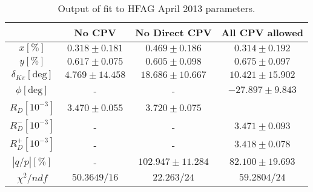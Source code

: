 \begin{table}[htdp]

\begin{center}
\begin{tabular}{|c||c||c||c|}
\hline
& No CPV & No Direct CPV & All CPV allowed \\ \hline

$x[\%]                    $ &$0.318\pm 0.181$ &$0.469\pm 0.186$ & $0.314\pm 0.192$\\ \hline

$y[\%]                    $ &$0.617\pm 0.075$ &$0.605\pm 0.098$ & $0.675\pm 0.097$\\ \hline

$\delta_{K\pi}[\text{deg}]$ &$4.769\pm 14.458$ &$18.686\pm 10.667$ &$10.421\pm 15.902$ \\ \hline

$\phi[\text{deg}]         $ &- &- &$-27.897\pm 9.843$ \\ \hline

$R_D[10^{-3}]             $ &$3.470\pm 0.055$ &$3.720\pm 0.075$ & \\ \hline

$R_D^-[10^{-3}]           $ &- &- &$3.471\pm 0.093$ \\ \hline

$R_D^+[10^{-3}]           $ &- &- &$3.418\pm 0.078$ \\ \hline

$|q/p|[\%]                $ &- &$102.947\pm 11.284$ &$82.100\pm 19.693$ \\ \hline

$\chi^2/ndf               $ &$50.3649/16$ &$22.263/24$ &$59.2804/24$ \\ \hline

\end{tabular}
\end{center}
\caption{Output of fit to HFAG April 2013 parameters.}
\label{table:hfag_2013_april_table}
\end{table}%


